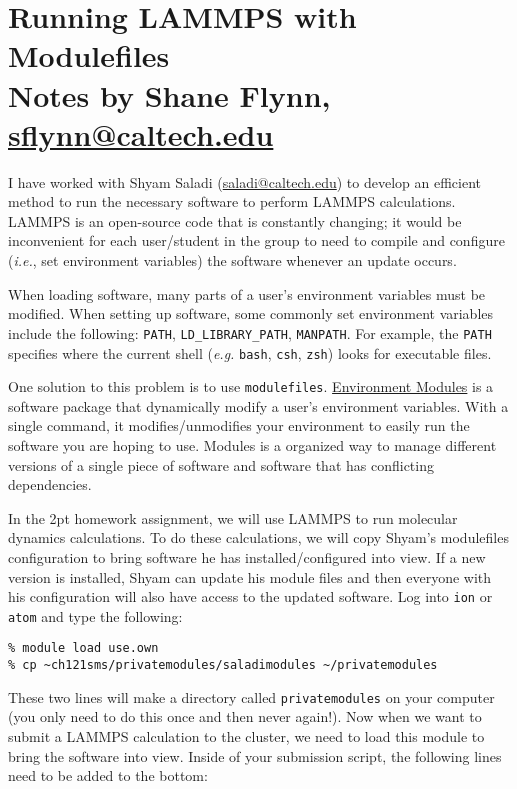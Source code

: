 \documentclass{article}
\author{
	Shane Flynn\\
	\texttt{sflynn@caltech.edu}
}
\begin{document}
\section*{Running LAMMPS with Modulefiles \\ Notes by Shane Flynn, \url{sflynn@caltech.edu}}

I have worked with Shyam Saladi (\url{saladi@caltech.edu}) to develop an efficient method to run the necessary software to perform LAMMPS calculations.
LAMMPS is an open-source code that is constantly changing; it would be inconvenient for each user/student in the group to need to compile and configure (\textit{i.e.}, set environment variables) the software whenever an update occurs.

When loading software, many parts of a user's environment variables must be modified.
When setting up software, some commonly set environment variables include the following: \texttt{PATH}, \texttt{LD\_LIBRARY\_PATH}, \texttt{MANPATH}.
For example, the \texttt{PATH} specifies where the current shell (\textit{e.g.} \texttt{bash}, \texttt{csh}, \texttt{zsh}) looks for executable files.

One solution to this problem is to use \texttt{modulefiles}.
\href{http://modules.sourceforge.net/}{Environment Modules} is a software package that dynamically modify a user's environment variables.
With a single command, it modifies/unmodifies your environment to easily run the software you are hoping to use.
Modules is a organized way to manage different versions of a single piece of software and software that has conflicting dependencies.

In the 2pt homework assignment, we will use LAMMPS to run molecular dynamics calculations.
To do these calculations, we will copy Shyam's modulefiles configuration to bring software he has installed/configured into view. If a new version is installed, Shyam can update his module files and then everyone with his configuration will also have access to the updated software.
Log into \texttt{ion} or \texttt{atom} and type the following:

\begin{lstlisting}
% module load use.own
% cp ~ch121sms/privatemodules/saladimodules ~/privatemodules
\end{lstlisting}

These two lines will make a directory called \texttt{privatemodules} on your computer (you only need to do this once and then never again!).
Now when we want to submit a LAMMPS calculation to the cluster, we need to load this module to bring the software into view.
Inside of your submission script, the following lines need to be added to the bottom:
\end{document}
